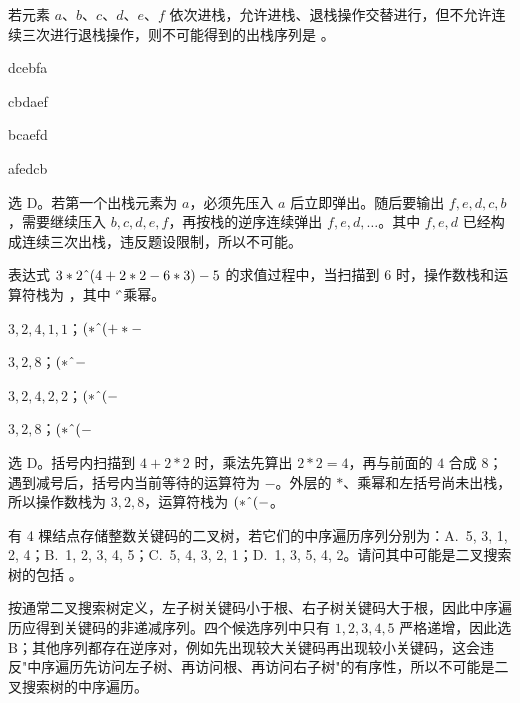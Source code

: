 \begin{question}
若元素 $a$、$b$、$c$、$d$、$e$、$f$ 依次进栈，允许进栈、退栈操作交替进行，但不允许连续三次进行退栈操作，则不可能得到的出栈序列是 \blank。
\begin{choiceoptions}[2]
  \item dcebfa
  \item cbdaef
  \item bcaefd
  \item afedcb
\end{choiceoptions}
\begin{solution}
选 D。若第一个出栈元素为 $a$，必须先压入 $a$ 后立即弹出。随后要输出 $f,e,d,c,b$，需要继续压入 $b,c,d,e,f$，再按栈的逆序连续弹出 $f,e,d,\ldots$。其中 $f,e,d$ 已经构成连续三次出栈，违反题设限制，所以不可能。
\end{solution}
\end{question}

\begin{question}
表达式 $3 * 2 \char`\^ (4+2*2-6*3)-5$ 的求值过程中，当扫描到 $6$ 时，操作数栈和运算符栈为 \blank，其中 \char`\^ 为乘幂。
\begin{choiceoptions}[2]
  \item $3,2,4,1,1$；$(*\char`\^(+*-$
  \item $3,2,8$；$(*\char`\^-$
  \item $3,2,4,2,2$；$(*\char`\^(-$
  \item $3,2,8$；$(*\char`\^(-$
\end{choiceoptions}
\begin{solution}
选 D。括号内扫描到 $4+2*2$ 时，乘法先算出 $2*2=4$，再与前面的 $4$ 合成 $8$；遇到减号后，括号内当前等待的运算符为 $-$。外层的 $*$、乘幂和左括号尚未出栈，所以操作数栈为 $3,2,8$，运算符栈为 $(*\char`\^(-$。
\end{solution}
\end{question}

\begin{question}
有 4 棵结点存储整数关键码的二叉树，若它们的中序遍历序列分别为：A.~5, 3, 1, 2, 4；B.~1, 2, 3, 4, 5；C.~5, 4, 3, 2, 1；D.~1, 3, 5, 4, 2。请问其中可能是二叉搜索树的包括 \blank。
\begin{solution}
按通常二叉搜索树定义，左子树关键码小于根、右子树关键码大于根，因此中序遍历应得到关键码的非递减序列。四个候选序列中只有 $1,2,3,4,5$ 严格递增，因此选 B；其他序列都存在逆序对，例如先出现较大关键码再出现较小关键码，这会违反"中序遍历先访问左子树、再访问根、再访问右子树"的有序性，所以不可能是二叉搜索树的中序遍历。
\end{solution}
\end{question}

